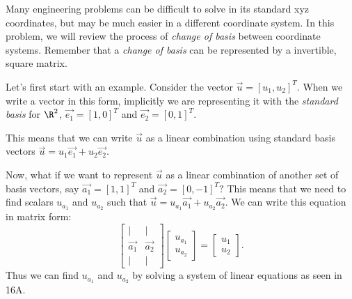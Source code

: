
Many engineering problems can be difficult to solve in its standard xyz coordinates, but may be much easier in a different coordinate system.
In this problem, we will review the process of \emph{change of basis} between coordinate systems.
Remember that a \emph{change of basis} can be represented by a invertible, square matrix.
\par

Let's first start with an example.
Consider the vector $\vec{u} = [u_1, u_2]^T.$ When we write a vector in this form, implicitly we are representing it with the \emph{standard basis} for $\R^{2}$, $\vec{e_1} = [1, 0]^T$ and $\vec{e_2} = [0, 1]^T.$ 

This means that we can write $\vec{u}$ as a linear combination using standard basis vectors $\vec{u} = u_1\vec{e_1} + u_2\vec{e_2}$.
\par

Now, what if we want to represent $\vec{u}$ as a linear combination of another set of basis vectors, say $\vec{a_1} = [1, 1]^T$ and $\vec{a_2} = [0, -1]^T?$
This means that we need to find scalars $u_{a_1}$ and $u_{a_2}$ such that $\vec{u} = u_{a_1}\vec{a_1} + u_{a_2}\vec{a_2}$.
We can write this equation in matrix form:
\[
  \begin{bmatrix}
    | & | \\
    \vec{a_1} & \vec{a_2} \\
    | & |
  \end{bmatrix}
  \begin{bmatrix} u_{a_1} \\ u_{a_2} \end{bmatrix} = \begin{bmatrix} u_{1} \\ u_{2} \end{bmatrix}
.\]
Thus we can find $u_{a_1}$ and $u_{a_2}$ by solving a system of linear equations as seen in 16A.
\par



